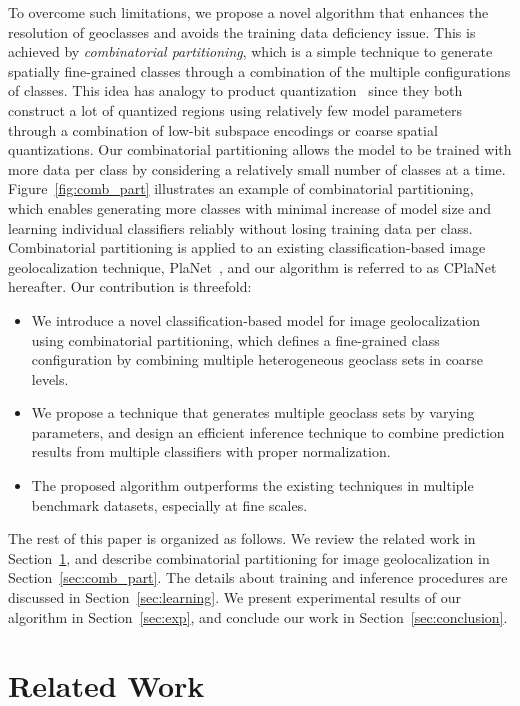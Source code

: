 \documentclass[runningheads]{llncs}
\begin{document}
To overcome such limitations, we propose a novel algorithm that enhances the resolution of geoclasses and avoids the training data deficiency issue.
This is achieved by \emph{combinatorial partitioning}, which is a simple technique to generate spatially fine-grained classes through a combination of the multiple configurations of classes.
This idea has analogy to product quantization~\cite{jegou11product} since they both construct a lot of quantized regions using relatively few model parameters through a combination of low-bit subspace encodings or coarse spatial quantizations.
Our combinatorial partitioning allows the model to be trained with more data per class by considering a relatively small number of classes at a time.
Figure~\ref{fig:comb_part} illustrates an example of combinatorial partitioning, which enables generating more classes with minimal increase of model size and learning individual classifiers reliably without losing training data per class.
Combinatorial partitioning is applied to an existing classification-based image geolocalization technique, PlaNet~\cite{weyand16planet}, and our algorithm is referred to as CPlaNet hereafter.
Our contribution is threefold:
\begin{itemize}
    \item[] We introduce a novel classification-based model for image geolocalization using combinatorial partitioning, which defines a fine-grained class configuration by combining multiple heterogeneous geoclass sets in coarse levels.
    \item[] We propose a technique that generates multiple geoclass sets by varying parameters, and design an efficient inference technique to combine prediction results from multiple classifiers with proper normalization.
\item[] The proposed algorithm outperforms the existing techniques in multiple benchmark datasets, especially at fine scales.
\end{itemize}

The rest of this paper is organized as follows. 
We review the related work in Section~\ref{sec:rel_work}, and describe combinatorial partitioning for image geolocalization in Section~\ref{sec:comb_part}.
The details about training and inference procedures are discussed in Section~\ref{sec:learning}.
We present experimental results of our algorithm in Section~\ref{sec:exp}, and conclude our work in Section~\ref{sec:conclusion}. 

\section{Related Work}
\label{sec:rel_work}
\end{document}
